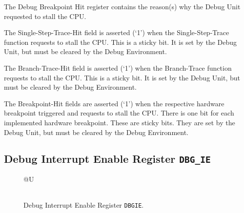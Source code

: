 \fi

The Debug Breakpoint Hit register contains the reason(s) why the Debug
Unit requested to stall the CPU.

The Single-Step-Trace-Hit field is asserted (`1') when the
Single-Step-Trace function requests to stall the CPU. This is a sticky
bit. It is set by the Debug Unit, but must be cleared by the Debug
Environment.

The Branch-Trace-Hit field is asserted (`1') when the Branch-Trace
function requests to stall the CPU. This is a sticky bit. It is set by
the Debug Unit, but must be cleared by the Debug Environment.

The Breakpoint-Hit fields are asserted (`1') when the respective
hardware breakpoint triggered and requests to stall the CPU. There is
one bit for each implemented hardware breakpoint. These are sticky bits.
They are set by the Debug Unit, but must be cleared by the Debug
Environment.

\subsection{Debug Interrupt Enable Register \texttt{DBG\_IE}} \label{debug-interrupt-enable-register-dbg_ie}

\ifdefined\MARKDOWN
\else

\begin{figure*}[htb!]
	{\footnotesize
		\begin{center}
			\begin{tabular}{@{}U}
				 \\
				\hline
				  \\
				\hline
			\end{tabular}
		\end{center}
	}
	\vspace{-0.1in}
	\caption{Debug Interrupt Enable Register \texttt{DBGIE}.}
	\label{fig:dbgiereg}
\end{figure*}

\fi

